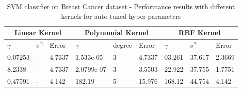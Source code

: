 {\begin{table}[!htpb]
\begin{tabular}{ |p{1.2cm}|p{1.2cm}|p{1.2cm}||p{2cm}|p{1.2cm}|p{1.2cm}||p{1.2cm}|p{1.2cm}|p{1.2cm}|}
		\hline
		\multicolumn{3}{|c||}{Linear Kernel} &\multicolumn{3}{|c||}{Polynomial Kernel}  &\multicolumn{3}{|c|}{RBF Kernel} \\ \hline	
		\cellcolor{blue!25}$\gamma$ &\cellcolor{blue!25}$\sigma^2$ & \cellcolor{blue!25}Error & \cellcolor{blue!25}$\gamma$ &\cellcolor{blue!25}degree &\cellcolor{blue!25}Error & \cellcolor{blue!25}$\gamma$ &\cellcolor{blue!25}$\sigma^2$ &\cellcolor{blue!25}Error \\ \hline
		0.07253 &-&4.7337 &1.533e-05 &3 &4.7337 &03.261 &37.617 &2.3669 \\ \hline
		8.2338 &- &4.7337 &2.0799e-07 &3  &3.5503 &22.922 &37.755 &1.7751 \\ \hline
		0.47591 &- &4.142 &182.19 &5 &15.976 &168.12 &44.754 &4.142 \\ \hline	
	\end{tabular}
	\caption{ SVM classifier on Breast Cancer dataset - Performance results with different kernels for auto tuned hyper parameters}
	\label{table:7}
\end{table}
}
